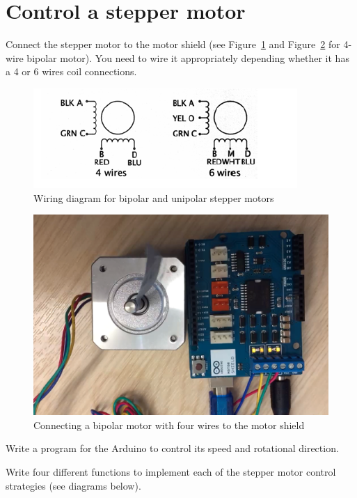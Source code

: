 \documentclass{instructions}
\begin{document}
\part{Control a stepper motor}


Connect the stepper motor to the motor shield (see Figure~\ref{wiring} and
Figure~\ref{connection} for 4-wire bipolar motor). You need to wire it
appropriately depending whether it has a 4 or 6 wires coil connections.

\begin{figure}[h!]
    \centering
    \includegraphics[width=0.7\linewidth]{figs/wiring.png}
    \caption{Wiring diagram for bipolar and unipolar stepper motors}
    \label{wiring}
\end{figure}


\begin{figure}[h!]
    \centering
    \includegraphics[width=0.7\linewidth]{figs/image7.png}
    \caption{Connecting a bipolar motor with four wires to the motor
  shield}
    \label{connection}
\end{figure}



  Write a program for the Arduino to control its speed and rotational direction.


  Write four different functions to implement each of the stepper
  motor control strategies (see diagrams below).
\end{document}
